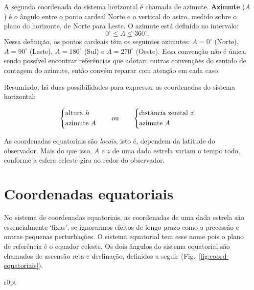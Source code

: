 A segunda coordenada do sistema horizontal é chamada de azimute. \textbf{Azimute} ($A$) é o ângulo entre o ponto cardeal Norte e o vertical do astro, medido sobre o plano do horizonte, de Norte para Leste. O azimute está definido no intervalo:
%
\begin{equation}
0^{\circ} \leqslant A \leqslant 360^{\circ}.
\end{equation}
%
Nessa definição, os pontos cardeais têm os seguintes azimutes: $A=0^{\circ}$ (Norte), $A=90^{\circ}$ (Leste), $A=180^{\circ}$ (Sul) e $A=270^{\circ}$ (Oeste). Essa convenção não é única, sendo possível encontrar referências que adotam outras convenções do sentido de contagem do azimute, então convém reparar com atenção em cada caso.

Resumindo, há duas possibilidades para expressar as coordenadas do sistema horizontal:

\begin{equation*}
\left\{
\begin{aligned}
& \text{altura}~h\\
& \text{azimute}~A
\end{aligned}
\right.
\qquad {\rm ou} \qquad
\left\{
\begin{aligned}
& \text{distância zenital}~z\\
& \text{azimute}~A
\end{aligned}
\right.
\end{equation*}

As coordenadas equatoriais são \textit{locais}, isto é, dependem da latitude do observador. Mais do que isso, $A$ e $z$ de uma dada estrela variam o tempo todo, conforme a esfera celeste gira ao redor do observador.

\section{Coordenadas equatoriais}

No sistema de coordenadas equatoriais, as coordenadas de uma dada estrela são essencialmente `fixas', se ignorarmos efeitos de longo prazo como a precessão e outras pequenas perturbações. O sistema equatorial tem esse nome pois o plano de referência é o equador celeste. Os dois ângulos do sistema equatorial são chamados de ascensão reta e declinação, definidos a seguir (Fig.~\ref{fig:coord-equatoriais}).

\newpage

\begin{wrapfigure}[20]{r}{0pt}

\caption{Coordenadas equatoriais: ascensão reta ($\alpha$) e declinação ($\delta$).}
\label{fig:coord-equatoriais}
\end{wrapfigure}

